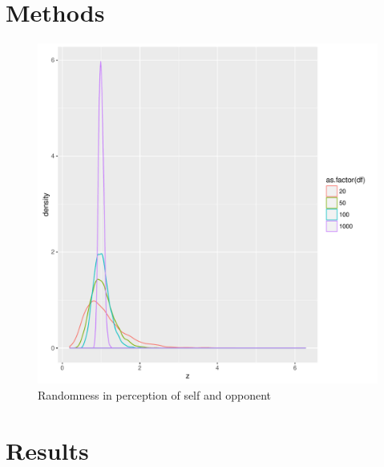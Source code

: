 \documentclass[a4paper,11pt]{article}
\begin{document}
\section{Methods}
\begin{figure}
  \includegraphics[width=\textwidth]{figures/fight_randomness.pdf}
  \caption{Randomness in perception of self and opponent}
\end{figure}

\section{Results}
\end{document}
